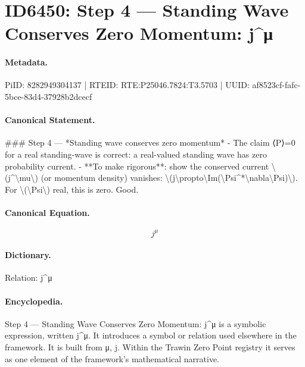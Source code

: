 \section*{ID6450: Step 4 — Standing Wave Conserves Zero Momentum: j\textasciicircum{}μ}
\paragraph{Metadata.}
PiID: 8282949304137 | RTEID: RTE:P25046.7824:T3.5703 | UUID: af8523cf-fafc-5bce-83d4-37928b2dcecf

\paragraph{Canonical Statement.}
\#\#\# Step 4 — *Standing wave conserves zero momentum* - The claim ⟨P⟩=0 for a real standing-wave is correct: a real-valued standing wave has zero probability current. - **To make rigorous**: show the conserved current \textbackslash{}(j\textasciicircum{}\textbackslash{}mu\textbackslash{}) (or momentum density) vanishes: \textbackslash{}(j\textbackslash{}propto\textbackslash{}Im(\textbackslash{}Psi\textasciicircum{}*\textbackslash{}nabla\textbackslash{}Psi)\textbackslash{}). For \textbackslash{}(\textbackslash{}Psi\textbackslash{}) real, this is zero. Good.

\paragraph{Canonical Equation.}
\[
j^\mu
\]

\paragraph{Dictionary.}
Relation: j\textasciicircum{}μ

\paragraph{Encyclopedia.}
Step 4 — Standing Wave Conserves Zero Momentum: j\textasciicircum{}μ is a symbolic expression, written j\textasciicircum{}μ. It introduces a symbol or relation used elsewhere in the framework. It is built from μ, j. Within the Trawin Zero Point registry it serves as one element of the framework's mathematical narrative.
